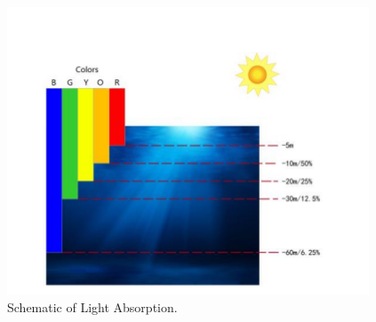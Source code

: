 \documentclass[10pt,twocolumn,letterpaper]{article}
\begin{document}
\begin{figure}[htbp]
	\begin{center}
		\includegraphics[scale=0.2]{light.png}
	\end{center}
	\caption{Schematic of Light Absorption.}
	\label{light}
\end{figure}
\end{document}
